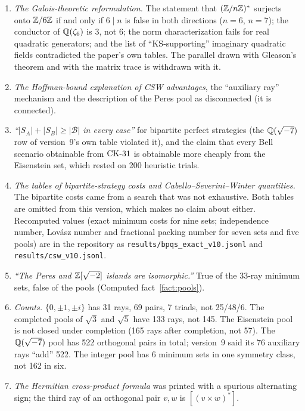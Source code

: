 \begin{enumerate}[label=C\arabic*.,leftmargin=2.6em]
3{,}756 SAT calls verified this lemma; nothing about minimal KS sets follows.  (The printed
definition also described deletion of a ray, not identification.)
\item \emph{The Galois-theoretic reformulation.}  The statement that $(\mathbb{Z}/n\mathbb{Z})^{*}$ surjects onto
$\mathbb{Z}/6\mathbb{Z}$ if and only if $6\mid n$ is false in both directions ($n=6$, $n=7$); the conductor of
$\mathbb{Q}(\zeta_6)$ is 3, not 6; the norm characterization fails for real quadratic generators; and the
list of ``KS-supporting'' imaginary quadratic fields contradicted the paper's own tables.  The
parallel drawn with Gleason's theorem and with the matrix trace is withdrawn with it.
\item \emph{The Hoffman-bound explanation of CSW advantages}, the ``auxiliary ray'' mechanism and
the description of the Peres pool as disconnected (it is connected).
\item \emph{``$|S_A|+|S_B|\ge|\mathcal B|$ in every case''} for bipartite perfect strategies
(the $\mathbb{Q}(\sqrt{-7})$ row of version~9's own table violated it), and the
claim that every Bell scenario obtainable from $\mathrm{CK}\text{-}31$ is obtainable more cheaply from the
Eisenstein set, which rested on 200 heuristic trials.
\item \emph{The tables of bipartite-strategy costs and Cabello--Severini--Winter quantities.}
The bipartite costs came from a search that was not exhaustive.  Both tables are omitted from
this version, which makes no claim about either.  Recomputed values (exact minimum costs for
nine sets; independence number, Lov\'asz number and fractional packing number for seven sets and
five pools) are in the repository as \texttt{results/bpqs\_exact\_v10.jsonl} and
\texttt{results/csw\_v10.jsonl}.
\item \emph{``The Peres and $\mathbb{Z}[\sqrt{-2}]$ islands are isomorphic.''}  True of the 33-ray minimum
sets, false of the pools (Computed fact~\ref{fact:pools}).
\item \emph{Counts.}  $\{0,\pm1,\pm i\}$ has 31 rays, 69 pairs, 7 triads, not 25/48/6.  The
completed pools of $\sqrt3$ and $\sqrt5$ have 133 rays, not 145.  The Eisenstein pool is not
closed under completion (165 rays after completion, not 57).  The $\mathbb{Q}(\sqrt{-7})$ pool has 522
orthogonal pairs in total; version~9 said its 76 auxiliary rays ``add'' 522.  The integer pool
has 6 minimum sets in one symmetry class, not 162 in six.
\item \emph{The Hermitian cross-product formula} was printed with a spurious alternating sign;
the third ray of an orthogonal pair $v,w$ is $[(v\times w)^{*}]$.

\end{enumerate}
